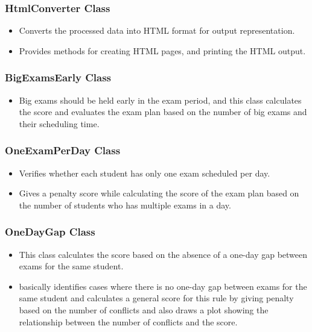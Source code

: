 \subsubsection{HtmlConverter Class}


\begin{itemize}
\item Converts the processed data into HTML format for output representation.
\item Provides methods for creating HTML pages, and printing the HTML output.

\end{itemize}


\subsubsection{BigExamsEarly Class}


\begin{itemize}
\item Big exams should be held early in the exam period, and this class calculates the score and evaluates the exam plan based on the number of big exams and their scheduling time.
\end{itemize}


\subsubsection{OneExamPerDay Class}


\begin{itemize}
\item Verifies whether each student has only one exam scheduled per day.
\item Gives a penalty score while calculating the score of the exam plan based on the number of students who has multiple exams in a day.
\end{itemize}

\subsubsection{OneDayGap Class}


\begin{itemize}
\item This class calculates the score based on the absence of a one-day gap between exams for the same student.
\item basically identifies cases where there is no one-day gap between exams for the same student and calculates a general score for this rule by giving penalty based on the number of conflicts and also draws a plot showing the relationship between the number of conflicts and the score.
\end{itemize}

